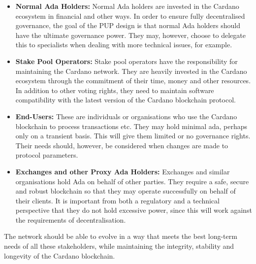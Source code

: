 \begin{itemize}
\item
  \textbf{Normal Ada Holders:}
  Normal Ada holders are invested in the Cardano ecosystem in financial and other ways.
   In order to ensure fully decentralised governance, the goal of the PUP design is that normal Ada holders should have the ultimate governance power. They may, however, choose to delegate this to specialists when dealing with more technical issues, for example.
  \item
  \textbf{Stake Pool Operators:}
  Stake pool operators have the responsibility for maintaining the Cardano network.  They are heavily invested in the Cardano ecosystem through the commitment of their time, money and other resources.
  In addition to other voting rights, they need to maintain software compatibility with the latest version of the Cardano blockchain protocol.
  \item
  \textbf{End-Users:}
  These are individuals or organisations who use the Cardano blockchain to process transactions etc.  They may hold minimal ada, perhaps only on a transient basis.
  This will give them limited or no governance rights.  Their needs should, however, be considered when changes are made to protocol parameters.
  \item
  \textbf{Exchanges and other Proxy Ada Holders:}
  Exchanges and similar organisations hold Ada on behalf of other parties.  They require a safe, secure and robust blockchain so that they may operate successfully on
  behalf of their clients.  It is important from both a regulatory and a technical perspective that they do not hold excessive
  power, since this will work against the requirements of decentralisation.
\end{itemize}

The network should be able to evolve in a way that meets the best long-term needs of all these stakeholders, while maintaining the integrity, stability and longevity of
the Cardano blockchain.

